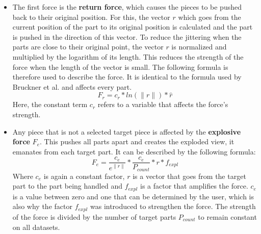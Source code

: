 \begin{itemize}
	\item The first force is the \textbf{return force}, which causes the pieces to be pushed back to their original position.
	For this, the vector $r$ which goes from the current position of the part to its original position is calculated and the part is pushed in the direction of this vector. 
	To reduce the jittering when the parts are close to their original point, the vector $r$ is normalized and multiplied by the logarithm of its length. 
	This reduces the strength of the force when the length of the vector is small. 
	The following formula is therefore used to describe the force. 
	It is identical to the formula used by Bruckner et al. and affects every part.
	\begin{equation}
		F_r = c_r * ln(\|r\|) * \hat{r}
		\label{eq:FB_return}
	\end{equation}
	Here, the constant term $c_r$ refers to a variable that affects the force's strength.
	
	\item Any piece that is not a selected target piece is affected by the \textbf{explosive force} $F_e$. This pushes all parts apart and creates the exploded view, it emanates from each target part. 
	It can be described by the following formula:
	\begin{equation}
		F_e = \frac{c_e}{e^{\|r\|}} * \frac{c_e}{P_{count}} * r * f_{expl}
		\label{eq:FB_explosion}
	\end{equation}
	Where $c_e$ is again a constant factor, $r$ is a vector that goes from the target part to the part being handled and $f_{expl}$ is a factor that amplifies the force. 
	$c_e$ is a value between zero and one that can be determined by the user, which is also why the factor $f_{expl}$ was introduced to strengthen the force. 
	The strength of the force is divided by the number of target parts $P_{count}$ to remain constant on all datasets. 
	

\end{itemize}
